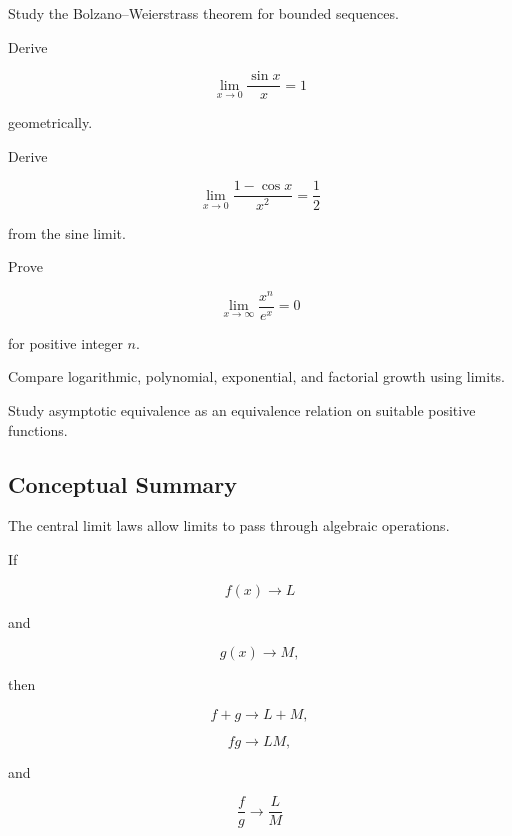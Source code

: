\begin{exercise}[4]
Study the Bolzano--Weierstrass theorem for bounded sequences.
\end{exercise}

\begin{exercise}[4]
Derive

\[
\lim_{x\to0}
\frac{\sin x}{x}=1
\]

geometrically.
\end{exercise}

\begin{exercise}[4]
Derive

\[
\lim_{x\to0}
\frac{1-\cos x}{x^2}
=
\frac12
\]

from the sine limit.
\end{exercise}

\begin{exercise}[4]
Prove

\[
\lim_{x\to\infty}
\frac{x^n}{e^x}
=
0
\]

for positive integer \(n\).
\end{exercise}

\begin{exercise}[4]
Compare logarithmic, polynomial, exponential, and factorial growth using
limits.
\end{exercise}

\begin{exercise}[4]
Study asymptotic equivalence as an equivalence relation on suitable positive
functions.
\end{exercise}

\subsection{Conceptual Summary}
\label{subsec:limit-laws-summary}

The central limit laws allow limits to pass through algebraic operations.

If

\[
f(x)\to L
\]

and

\[
g(x)\to M,
\]

then

\[
\boxed{
f+g\to L+M,
}
\]

\[
\boxed{
fg\to LM,
}
\]

and

\[
\boxed{
\frac{f}{g}
\to
\frac{L}{M}
}
\]


